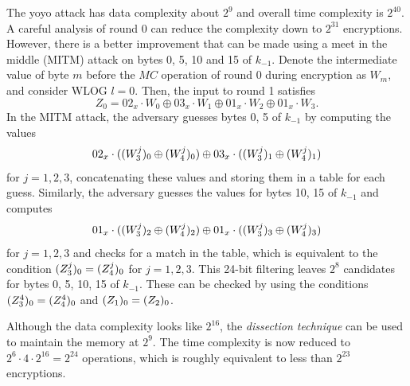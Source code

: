 \documentclass[notheorems]{beamer}
\theoremstyle{definition}
\theoremstyle{example}
\begin{document}
The yoyo attack has data complexity about \(2^9\) and overall time complexity is
\(2^{40}\). A careful analysis of round 0 can reduce the complexity down to
\(2^{31}\) encryptions. However, there is a better improvement that can be made
using a meet in the middle (MITM) attack on bytes 0, 5, 10 and 15 of \(k_{-1}\).
Denote the intermediate value of byte \(m\) before the \(MC\) operation of round
0 during encryption as \(W_m\), and consider WLOG \(l = 0\). Then, the input to
round 1 satisfies
\begin{equation}
    Z_0 = 02_x \cdot W_0 \oplus 03_x \cdot W_1 \oplus 01_x \cdot W_2 \oplus 01_x \cdot W_3.
    \label{eq:mitm}
\end{equation} 
In the MITM attack, the adversary guesses bytes 0, 5 of \(k_{-1}\) by computing
the values
\begin{equation}
    02_x \cdot ((W_3^j)_0 \oplus (W_4^j)_0) \oplus 03_x \cdot ((W_3^j)_1 \oplus (W_4^j)_1)
    \label{eq:mitm-0-5}
\end{equation}
for \(j = 1, 2, 3\), concatenating these values and storing them in a table for
each guess. Similarly, the adversary guesses the values for bytes 10, 15 of
\(k_{-1}\) and computes 
\begin{equation}
    01_x \cdot ((W_3^j)_2 \oplus (W_4^j)_2) \oplus 01_x \cdot ((W_3^j)_3 \oplus (W_4^j)_3)
    \label{eq:mitm-10-15}
\end{equation}
for \(j = 1, 2, 3\) and checks for a match in the table, which is equivalent to
the condition \((Z_3^j)_0 = (Z_4^j)_0\) for \(j = 1, 2, 3\). This
24-bit filtering leaves \(2^8\) candidates for bytes 0, 5, 10, 15 of \(k_{-1}\).
These can be checked by using the conditions \((Z_3^4)_0 = (Z_4^4)_0\)
and \((Z_1)_0 = (Z_2)_0\).

Although the data complexity looks like \(2^{16}\), the \emph{dissection
technique} can be used to maintain the memory at \(2^9\). The time complexity is
now reduced to \(2^6 \cdot 4 \cdot 2^{16} = 2^{24}\) operations, which is
roughly equivalent to less than \(2^{23}\) encryptions.
\end{document}
